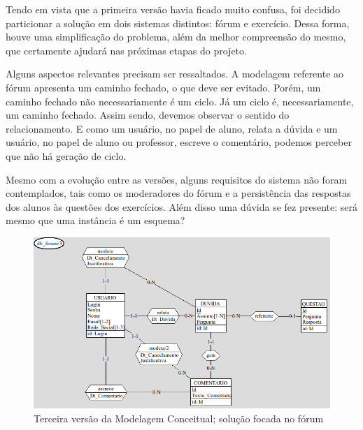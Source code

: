 \documentclass[graduacao,brazil]{ThesisPUC}
\begin{document}
Tendo em vista que a primeira vers\~{a}o havia ficado muito confusa, foi decidido particionar a
solu\c{c}\~{a}o em dois sistemas distintos: f\'{o}rum e exerc\'{i}cio. Dessa forma, houve uma simplifica\c{c}\~{a}o do
problema, al\'{e}m da melhor compreens\~{a}o do mesmo, que certamente ajudar\'{a} nas pr\'{o}ximas etapas
do projeto.

Alguns aspectos relevantes precisam ser ressaltados. A modelagem referente ao f\'{o}rum
apresenta um caminho fechado, o que deve ser evitado. Por\'{e}m, um caminho fechado n\~{a}o
necessariamente \'{e} um ciclo. J\'{a} um ciclo \'{e}, necessariamente, um caminho fechado. Assim sendo,
devemos observar o sentido do relacionamento. E como um usu\'{a}rio, no papel de aluno, relata a
d\'{u}vida e um usu\'{a}rio, no papel de aluno ou professor, escreve o coment\'{a}rio, podemos perceber
que n\~{a}o h\'{a} gera\c{c}\~{a}o de ciclo.

Mesmo com a evolu\c{c}\~{a}o entre as vers\~{o}es, alguns requisitos do sistema n\~{a}o foram
contemplados, tais como os moderadores do f\'{o}rum e a persist\^{e}ncia das respostas dos alunos \`{a}s
quest\~{o}es dos exerc\'{i}cios. Al\'{e}m disso uma d\'{u}vida se fez presente: ser\'{a} mesmo que uma inst\^{a}ncia
\'{e} um esquema?

\begin{figure}[H]
    \centering
    \includegraphics[width=\linewidth]{Imagens/ModelagemConceitual_forum_v2_0.png}
    \caption{Terceira vers\~{a}o da Modelagem Conceitual; solu\c{c}\~{a}o focada no f\'{o}rum}
\end{figure}
\end{document}
